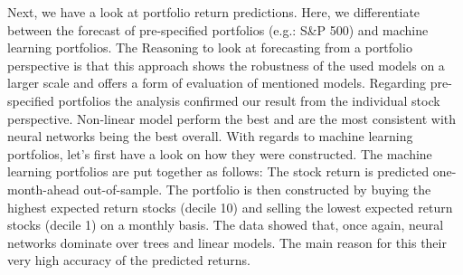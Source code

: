 \documentclass{article}
\begin{document}
\newline
Next, we have a look at portfolio return predictions. Here, we differentiate between the forecast of pre-specified portfolios (e.g.: S\&P 500) and machine learning portfolios.
The Reasoning to look at forecasting from a portfolio perspective is that this approach shows the robustness of the used models on a larger scale and offers a form of evaluation of mentioned models. 
Regarding pre-specified portfolios the analysis confirmed our result from the individual stock perspective. Non-linear model perform the best and are the most consistent with neural networks being the best overall. 
With regards to machine learning portfolios, let’s first have a look on how they were constructed. The machine learning portfolios are put together as follows: The stock return is predicted one-month-ahead out-of-sample. The portfolio is then constructed by buying the highest expected return stocks (decile 10) and selling the lowest expected return stocks (decile 1) on a monthly basis.
The data showed that, once again, neural networks dominate over trees and linear models. The main reason for this their very high accuracy of the predicted returns. 
\end{document}
